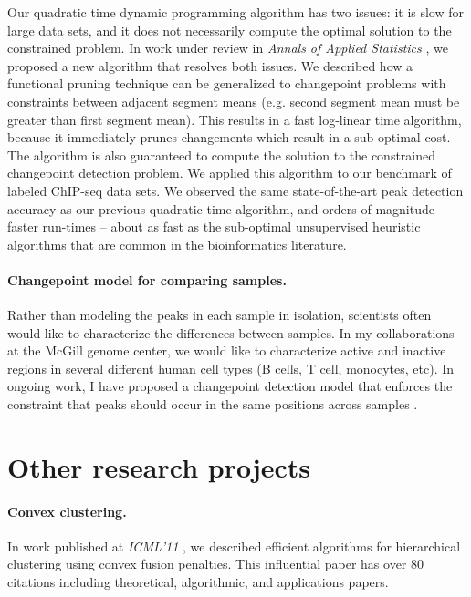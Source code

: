 \documentclass{article}
\begin{document}
Our quadratic time dynamic programming algorithm has two issues: it is
slow for large data sets, and it does not necessarily compute the
optimal solution to the constrained problem. In work under review in
\emph{Annals of Applied Statistics}
\citep{Hocking-constrained-changepoint-detection}, we proposed a new
algorithm that resolves both issues. We described how a functional
pruning technique can be generalized to changepoint problems with
constraints between adjacent segment means (e.g. second segment mean
must be greater than first segment mean). This results in a fast
log-linear time algorithm, because it immediately prunes changements
which result in a sub-optimal cost. The algorithm is also guaranteed
to compute the solution to the constrained changepoint detection
problem. We applied this algorithm to our benchmark of labeled
ChIP-seq data sets. We observed the same state-of-the-art peak
detection accuracy as our previous quadratic time algorithm, and
orders of magnitude faster run-times -- about as fast as the
sub-optimal unsupervised heuristic algorithms that are common 
in the bioinformatics literature.

\paragraph{Changepoint model for comparing samples.}
Rather than modeling the peaks in each sample in isolation, scientists
often would like to characterize the differences between samples. In
my collaborations at the McGill genome center, we would like to
characterize active and inactive regions in several different human
cell types (B cells, T cell, monocytes, etc). In ongoing work, I have
proposed a changepoint detection model that enforces the constraint that peaks
should occur in the same positions across samples
\citep{HOCKING-PeakSegJoint}.

\section{Other research projects}

\paragraph{Convex clustering.} In work published at \emph{ICML'11}
\citep{HOCKING-clusterpath}, we described efficient algorithms for
hierarchical clustering using convex fusion penalties. This
influential paper has over 80 citations
including theoretical, algorithmic, and applications papers.
\end{document}
